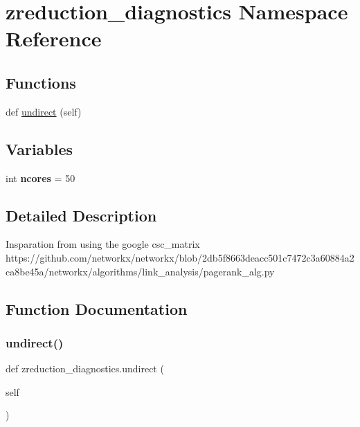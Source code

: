 \hypertarget{namespacezreduction__diagnostics}{}\section{zreduction\+\_\+diagnostics Namespace Reference}
\label{namespacezreduction__diagnostics}
\subsection*{Functions}
\begin{DoxyCompactItemize}
\item 
def \mbox{\hyperlink{namespacezreduction__diagnostics_a42c5959d3e8fa7583245637112b84961}{undirect}} (self)
\end{DoxyCompactItemize}
\subsection*{Variables}
\begin{DoxyCompactItemize}
\item 
\mbox{\label{namespacezreduction__diagnostics_a37db539398db5c40c1970b992b1d7c8c}} 
int {\bfseries ncores} = 50
\end{DoxyCompactItemize}


\subsection{Detailed Description}
\begin{DoxyVerb}Insparation from using the google csc_matrix
https://github.com/networkx/networkx/blob/2db5f8663deacc501c7472c3a60884a2ca8be45a/networkx/algorithms/link_analysis/pagerank_alg.py
\end{DoxyVerb}
 

\subsection{Function Documentation}
\mbox{\label{namespacezreduction__diagnostics_a42c5959d3e8fa7583245637112b84961}} 
\subsubsection{\texorpdfstring{undirect()}{undirect()}}
{\footnotesize\ttfamily def zreduction\+\_\+diagnostics.\+undirect (\begin{DoxyParamCaption}\item[{}]{self }\end{DoxyParamCaption})}

